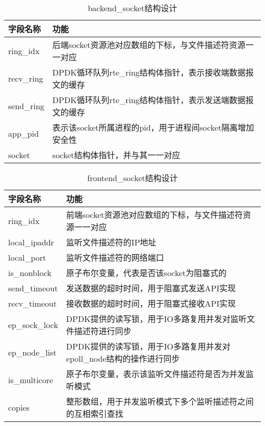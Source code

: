 \begin{table}[]
\centering
\caption{backend\_socket结构设计}
\label{tab:backend_socket}
\begin{tabular}{ll}
\toprule[1.5pt]
\textbf{字段名称} & \textbf{功能} \\ 
\midrule[1pt]
ring\_idx & 后端socket资源池对应数组的下标，与文件描述符资源一一对应 \\
recv\_ring & DPDK循环队列rte\_ring结构体指针，表示接收端数据报文的缓存 \\
send\_ring & DPDK循环队列rte\_ring结构体指针，表示发送端数据报文的缓存 \\
app\_pid & 表示该socket所属进程的pid，用于进程间socket隔离增加安全性\\
socket & socket结构体指针，并与其一一对应 \\
\bottomrule[1.5pt]
\end{tabular}
\end{table}

\begin{table}[]
\centering
\caption{frontend\_socket结构设计}
\label{tab:frontend_socket}
\begin{tabular}{ll}
\toprule[1.5pt]
\textbf{字段名称} & \textbf{功能} \\ 
\midrule[1pt]
ring\_idx & 前端socket资源池对应数组的下标，与文件描述符资源一一对应 \\
local\_ipaddr & 监听文件描述符的IP地址 \\
local\_port & 监听文件描述符的网络端口 \\
is\_nonblock & 原子布尔变量，代表是否该socket为阻塞式的\\
send\_timeout & 发送数据的超时时间，用于阻塞式发送API实现\\
recv\_timeout & 接收数据的超时时间，用于阻塞式接收API实现 \\
ep\_sock\_lock & DPDK提供的读写锁，用于IO多路复用并发对监听文件描述符进行同步 \\
ep\_node\_list & DPDK提供的读写锁，用于IO多路复用并发对epoll\_node结构的操作进行同步 \\
is\_multicore & 原子布尔变量，表示该监听文件描述符是否为并发监听模式 \\
copies & 整形数组，用于并发监听模式下多个监听描述符之间的互相索引查找 \\
\bottomrule[1.5pt]
\end{tabular}
\end{table}

